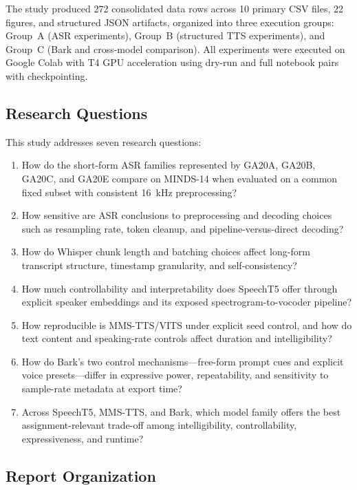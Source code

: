 \documentclass[conference]{IEEEtran}
\begin{document}
The study produced 272 consolidated data rows across 10 primary CSV files, 22 figures, and structured JSON artifacts, organized into three execution groups: Group~A (ASR experiments), Group~B (structured TTS experiments), and Group~C (Bark and cross-model comparison). All experiments were executed on Google Colab with T4 GPU acceleration using dry-run and full notebook pairs with checkpointing.

\subsection{Research Questions}

This study addresses seven research questions:

\begin{enumerate}
    \item[\textbf{RQ1.}] How do the short-form ASR families represented by GA20A, GA20B, GA20C, and GA20E compare on MINDS-14 when evaluated on a common fixed subset with consistent 16~kHz preprocessing?
    \item[\textbf{RQ2.}] How sensitive are ASR conclusions to preprocessing and decoding choices such as resampling rate, token cleanup, and pipeline-versus-direct decoding?
    \item[\textbf{RQ3.}] How do Whisper chunk length and batching choices affect long-form transcript structure, timestamp granularity, and self-consistency?
    \item[\textbf{RQ4.}] How much controllability and interpretability does SpeechT5 offer through explicit speaker embeddings and its exposed spectrogram-to-vocoder pipeline?
    \item[\textbf{RQ5.}] How reproducible is MMS-TTS/VITS under explicit seed control, and how do text content and speaking-rate controls affect duration and intelligibility?
    \item[\textbf{RQ6.}] How do Bark's two control mechanisms---free-form prompt cues and explicit voice presets---differ in expressive power, repeatability, and sensitivity to sample-rate metadata at export time?
    \item[\textbf{RQ7.}] Across SpeechT5, MMS-TTS, and Bark, which model family offers the best assignment-relevant trade-off among intelligibility, controllability, expressiveness, and runtime?
\end{enumerate}

\subsection{Report Organization}
\end{document}
